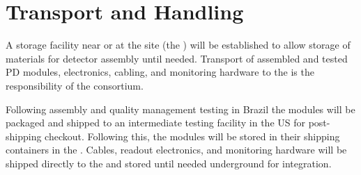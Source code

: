 \section{Transport and Handling}
\label{sec:fdsp-pd-install}


%


A storage facility near or at the  site (the ) will be established to allow storage of materials for detector assembly until needed.  Transport of assembled and tested PD modules, electronics, cabling, and monitoring hardware to the  is the responsibility of the  consortium.



Following assembly and quality management testing in Brazil the  modules  will be packaged and shipped to an intermediate testing facility in the US for post-shipping checkout. Following this, the modules will be stored in their shipping containers in the .  Cables, readout electronics, and monitoring hardware will be shipped directly to the  and stored until needed underground for integration.

